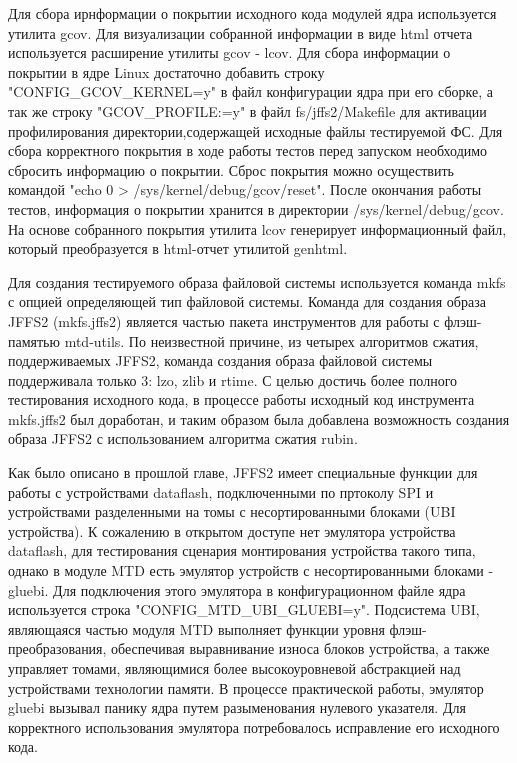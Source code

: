 Для сбора ирнформации о покрытии исходного кода модулей ядра используется утилита gcov. Для визуализации собранной информации в виде html отчета используется расширение утилиты gcov - lcov. Для сбора информации о покрытии в ядре Linux достаточно добавить строку  "CONFIG\_GCOV\_KERNEL=y"  в файл конфигурации ядра при его сборке, а так же строку  "GCOV\_PROFILE:=y"  в файл fs/jffs2/Makefile для активации профилирования директории,содержащей исходные файлы тестируемой ФС. Для сбора корректного покрытия в ходе работы тестов перед запуском необходимо сбросить информацию о покрытии. Сброс покрытия можно осуществить командой  "echo 0 > /sys/kernel/debug/gcov/reset". После окончания работы тестов, информация о покрытии хранится в директории /sys/kernel/debug/gcov. На основе собранного покрытия утилита lcov генерирует информационный файл, который преобразуется в html-отчет утилитой genhtml.

Для создания тестируемого образа файловой системы используется команда mkfs с опцией определяющей тип файловой системы. Команда для создания образа JFFS2 (mkfs.jffs2) является частью пакета инструментов для работы с флэш-памятью mtd-utils. По неизвестной причине, из четырех алгоритмов сжатия, поддерживаемых JFFS2, команда создания образа файловой системы поддерживала только 3: lzo, zlib и rtime. С целью достичь более полного тестирования исходного кода, в процессе работы исходный код инструмента mkfs.jffs2 был доработан, и таким образом была добавлена возможность создания образа JFFS2 с использованием алгоритма сжатия rubin.

Как было описано в прошлой главе, JFFS2 имеет специальные функции для работы с устройствами dataflash, подключенными по пртоколу SPI и устройствами разделенными на томы с несортированными блоками (UBI устройства). К сожалению в открытом доступе нет эмулятора устройства dataflash, для тестирования сценария монтирования устройства такого типа, однако в модуле MTD есть эмулятор устройств с несортированными блоками - gluebi. Для подключения этого эмулятора в конфигурационном файле ядра используется строка "CONFIG\_MTD\_UBI\_GLUEBI=y". Подсистема UBI, являющаяся частью модуля MTD выполняет функции уровня флэш-преобразования, обеспечивая выравнивание износа блоков устройства, а также управляет томами, являющимися более высокоуровневой абстракцией над устройствами технологии памяти. В процессе практической работы, эмулятор gluebi вызывал панику ядра путем разыменования нулевого указателя. Для корректного использования эмулятора потребовалось исправление его исходного кода.

